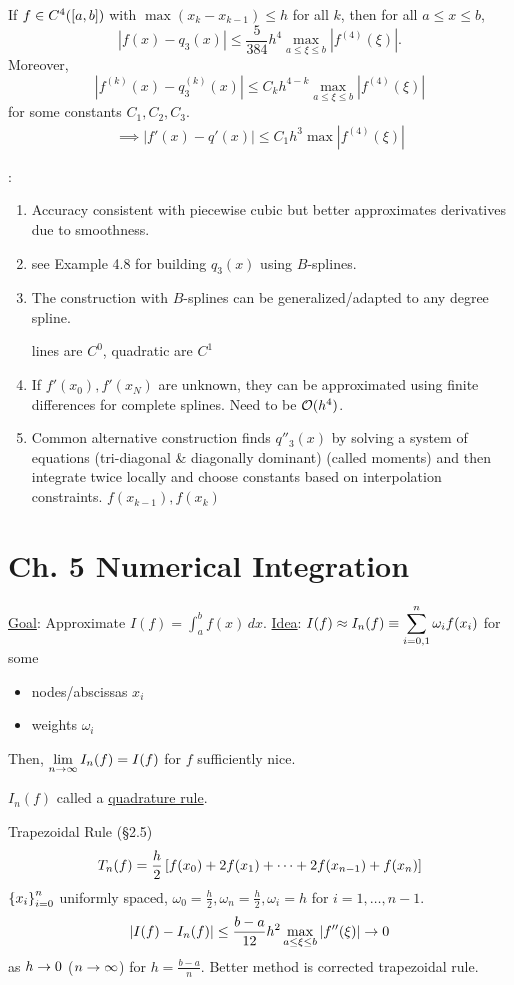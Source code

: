 \documentclass[]{article}
\begin{document}
\begin{theorem}
	[Convergence]
	If $f\in C^{4}({[}a,b{]})$ with $\max (x_k-x_{k-1})\leq h$ for all $k$, then for all $a\leq x\leq b$, $$ |f(x)-q_3(x)| \leq \frac5{384}h^4 \max_{a\leq\xi\leq b} |f^{(4)}(\xi)|. $$
	Moreover, $$|f^{(k)}(x)-q_3^{(k)}(x)| \leq C_kh^{4-k}\max_{a\leq\xi\leq b}|f^{(4)}(\xi)|$$ for some constants $C_1,C_2,C_3$.
	\begin{align*}
		\implies |f'(x)-q'(x)| \leq C_1h^3 \max |f^{(4)}(\xi)|
	\end{align*}
\end{theorem}
\begin{note}:
	\begin{enumerate}
		\item Accuracy consistent with piecewise cubic but better approximates derivatives due to smoothness. %
		\item see Example 4.8 for building $q_3(x)$ using $B$-splines.
		\item The construction with $B$-splines can be generalized/adapted to any degree spline.

			lines are $C^0$, quadratic are $C^1$
		\item If $f'(x_0),f'(x_N)$ are unknown, they can be approximated using finite differences for complete splines.
			Need to be $\mathcal{O}(h^4)$.
		\item Common alternative construction finds $q''_3(x)$ by solving a system of equations (tri-diagonal \& diagonally dominant) (called moments) and then integrate twice locally and choose constants based on interpolation constraints. $f(x_{k-1}),f(x_k)$
	\end{enumerate}
\end{note}

\section*{Ch. 5 Numerical Integration}

\ul{Goal}: Approximate $I(f)=\int_a^b f(x)\,dx$.
\ul{Idea}: $\displaystyle I(f) \approx I_n(f) \equiv \sum_{i=0,1}^n \omega_if(x_i)$ for some
\begin{itemize}
	\item nodes/abscissas $x_i$
	\item weights $\omega_i$
\end{itemize}
Then, $\displaystyle\lim_{n\rightarrow\infty} I_n(f) = I(f)$ for $f$ sufficiently nice.
\begin{definition}
	$I_n(f)$ called a \ul{quadrature rule}.
\end{definition}

\begin{example}
	Trapezoidal Rule (\S2.5)
	$$ T_n(f) = \frac h2 \left[ f(x_0)+2f(x_1)+\dots+2f(x_{n-1})+f(x_n) \right] $$
	$\left\{ x_i \right\}_{i=0}^n$ uniformly spaced, $\omega_0 = \frac h2,\omega_n = \frac h2, \omega_i = h$ for $i=1,\dots,n-1$.
	$$ |I(f)-I_n(f)| \leq \frac{b-a}{12}h^2 \max_{a\leq\xi\leq b}|f''(\xi)| \rightarrow 0 $$
	as $h\rightarrow 0$ ($n\rightarrow\infty$) for $h = \frac{b-a}n$. Better method is corrected trapezoidal rule.
\end{example}
\end{document}
